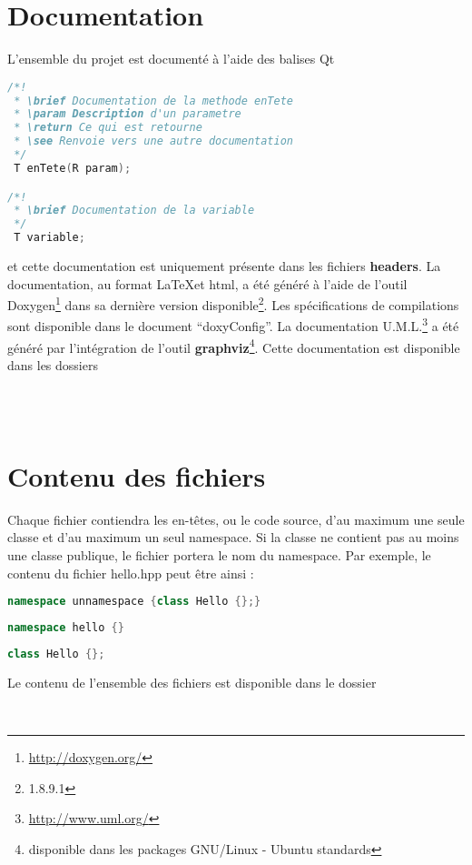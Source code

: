 \documentclass[a4paper,11pt]{report}
\begin{document}
\section{Documentation}
L'ensemble du projet est documenté à l'aide des balises Qt 
\begin{lstlisting}[frame=single,language=C++]
/*!
 * \brief Documentation de la methode enTete
 * \param Description d'un parametre
 * \return Ce qui est retourne
 * \see Renvoie vers une autre documentation
 */
 T enTete(R param);

/*!
 * \brief Documentation de la variable
 */
 T variable;
\end{lstlisting}
et cette documentation est uniquement présente dans les fichiers \textbf{headers}.
La documentation, au format \LaTeX et html, a été généré à l'aide de l'outil
Doxygen\footnote{\url{http://doxygen.org/}} dans sa dernière version
disponible\footnote{1.8.9.1}. Les spécifications de compilations sont disponible
dans le document ``doxyConfig''. La documentation
U.M.L.\footnote{\url{http://www.uml.org/}} a été généré par l'intégration de
l'outil \textbf{graphviz}\footnote{disponible dans les packages GNU/Linux -
Ubuntu standards}.
Cette documentation est disponible dans les dossiers
\begin{center}
 \\
 \\
\end{center}
\section{Contenu des fichiers}
Chaque fichier contiendra les en-têtes, ou le code source, d'au maximum une seule 
classe et d'au maximum un seul namespace. Si la classe ne contient pas au moins
une classe publique, le fichier portera le nom du namespace.
Par exemple, le contenu du fichier hello.hpp peut être ainsi :
\begin{lstlisting}[frame=single,language=C++]
namespace unnamespace {class Hello {};}
\end{lstlisting}
\begin{lstlisting}[frame=single,language=C++]
namespace hello {}
\end{lstlisting}
\begin{lstlisting}[frame=single,language=C++]
class Hello {};
\end{lstlisting}
Le contenu de l'ensemble des fichiers est disponible dans le dossier
\begin{center}
 \\
\end{center}
\end{document}
